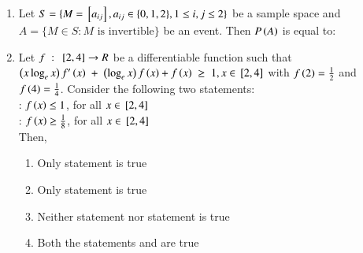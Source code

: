 \documentclass[journal,,12pt,onecolumn]{IEEEtran}
\theoremstyle{remark}
\begin{document}
\begin{enumerate}
\begin{enumerate}
        \end{enumerate}
        \bigskip
    \item Let $S=\{M={}\left[a_{ij}\right],a_{ij} \in \{0,1,2\},1 \le i,j \le 2\}$ be a sample space and $A=\{M \in S : M\text{ is invertible}\}$ be an event. Then $P\left(A\right)$ is equal to:
    \begin{enumerate}
        \end{enumerate}
\bigskip
 
 \item Let $f\;:\;{}\left[2,4\right] \rightarrow R$ be a differentiable function such that $\left(x\log_{e}{x}\right)f'\left(x\right)\;+\;\left(\log_{e}{x}\right)f\left(x\right)+f\left(x\right)\; \ge \; 1, x\in {}\left[2,4\right] $ with $f\left(2\right)=\frac{1}{2}$ and $f\left(4\right)=\frac{1}{4}$. Consider the following two statements: \\
  : $f\left(x\right)\le 1$, for all $x \in {}\left[2,4\right]$ \\
  : $f\left(x\right)\ge \frac{1}{8}$, for all $x \in {}\left[2,4\right]$\\
 Then,
 \begin{enumerate}
     \item Only statement  is true
     \item Only statement  is true 
     \item Neither statement  nor statement  is true
     \item Both the statements  and  are true 
 \end{enumerate}
 

\end{enumerate}
\end{document}
